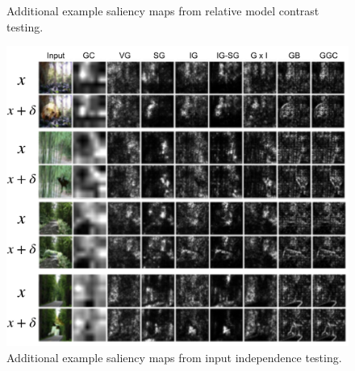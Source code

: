 \begin{appendix}
\begin{figure}
  \caption{Additional example saliency maps from relative model contrast testing.}
\end{figure}

\clearpage

\begin{figure}
  \includegraphics[width=1.\linewidth]{figures/ii_demo_extra.jpg}
  \caption{Additional example saliency maps from input independence testing.}
\end{figure}

\end{appendix}